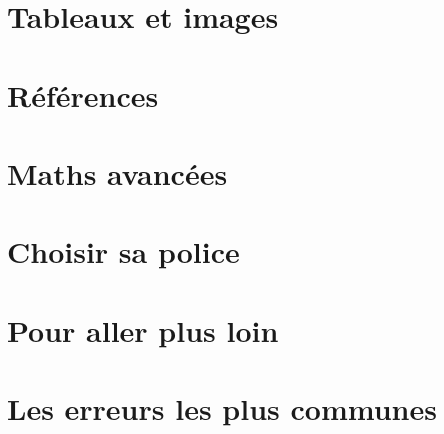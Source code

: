 \documentclass[11pt]{article}				%
\begin{document}
\section{Tableaux et images}

\section{Références}

\section{Maths avancées}

\section{Choisir sa police}

\section{Pour aller plus loin}

\section{Les erreurs les plus communes}
\end{document}
